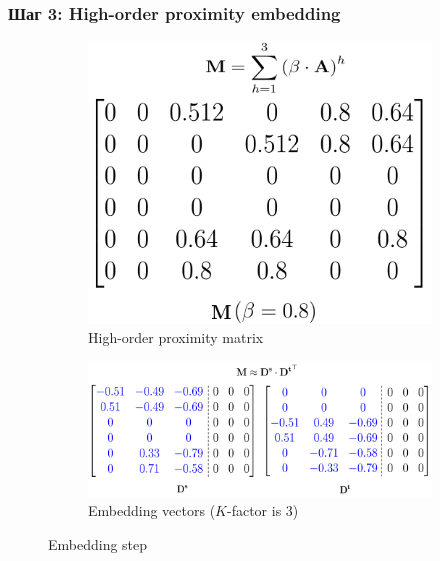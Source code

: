 \documentclass[xcolor=table,english]{beamer}
\begin{document}
\begin{frame}[fragile] \frametitle{Шаг 3: High-order proximity embedding}
    \begin{figure}
        \centering
        \begin{subfigure}[b]{0.38\textwidth}
            \includegraphics[width=\textwidth]{figures/proximity_matrix.png}
            \caption{High-order proximity matrix}
        \end{subfigure}
        \hfill
        \begin{subfigure}[b]{0.6\textwidth}
            \includegraphics[width=\textwidth]{figures/embedding_vectors.png}
            \caption{Embedding vectors ($K$-factor is 3)}
        \end{subfigure}
        \caption{Embedding step}
    \end{figure}
\end{frame}
\end{document}
